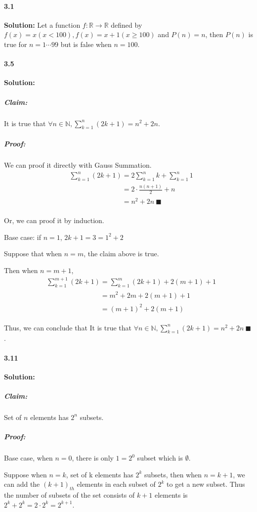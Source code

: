 \documentclass{article}[11pt]
\begin{document}
	\paragraph{3.1}\textbf{Solution:} Let a function $f: \mathbb{R} \rightarrow \mathbb{R}$ defined by $f(x) = x (x < 100), f(x) = x + 1 (x \geq 100)$ and $P(n) = n$, then $P(n)$ is true for $n = 1 \cdots 99$ but is false when $n = 100$.
	\paragraph{3.5}\textbf{Solution:}
			\subparagraph{Claim:} It is true that $\forall n \in \mathbb{N}, \sum^n_{k=1}(2k+1) = n^2 + 2n$.
			\subparagraph{Proof:} We can proof it directly with Gauss Summation.
				\begin{align}
					&\sum^n_{k=1}(2k+1) =2\sum^n_{k=1}k + \sum^n_{k=1}1\nonumber\\
					&\phantom{\sum^n_{k=1}(2k+1)} = 2\cdot \frac{n(n+1)}{2} + n\nonumber\\
					&\phantom{\sum^n_{k=1}(2k+1)} = n^2 + 2n\ \blacksquare\nonumber
				\end{align}
				
				Or, we can proof it by induction.
				
				Base case: if $n = 1$, $2k + 1 = 3 = 1^2 + 2$
				
				Suppose that when $n = m$, the claim above is true.
				
				Then when $n = m + 1$,
				\begin{align}
					&\sum^{m+1}_{k=1}(2k+1) = \sum^{m}_{k=1}(2k+1) + 2(m+1) + 1\nonumber\\
					&\phantom{\sum^{m+1}_{k=1}(2k+1)} = m^2 + 2m + 2(m+1) + 1\nonumber\\
					&\phantom{\sum^{m+1}_{k=1}(2k+1)} = (m + 1)^2 + 2(m + 1)\nonumber
				\end{align}
				
				Thus, we can conclude that It is true that $\forall n \in \mathbb{N}, \sum^n_{k=1}(2k+1) = n^2 + 2n\ \blacksquare$.
				
	\paragraph{3.11}\textbf{Solution:}
		\subparagraph{Claim:} Set of $n$ elements has $2^n$ subsets.
		\subparagraph{Proof:} Base case, when $n = 0$, there is only $1 = 2^0$ subset which is $\emptyset$.
		
			Suppose when $n = k$, set of k elements has $2^k$ subsets, then when $n = k + 1$, we can add the $(k + 1)_{th}$ elements in each subset of $2^k$ to get a new subset. Thus the number of subsets of the set consists of $k + 1$ elements is $2^k + 2^k = 2 \cdot 2^k = 2^{k+1}$.
			
\end{document}
